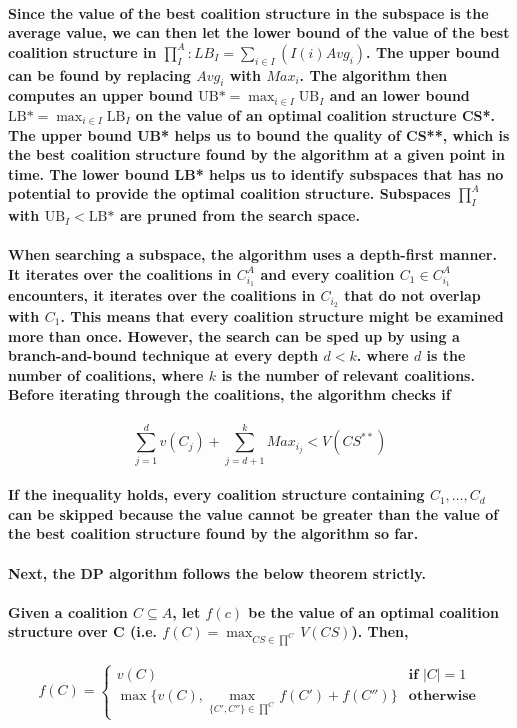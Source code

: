 \documentclass[11pt]{report}
\begin{document}
\paragraph{Since the value of the best coalition structure in the subspace is the average value, we can then let the lower bound of the value of the best coalition structure in $\prod^A_I:LB_I=\sum_{i\in I}(I(i)Avg_i)$. The upper bound can be found by replacing $Avg_i$ with $Max_i$. The algorithm then computes an upper bound $\text{UB*}= \max_{i\in I}\text{UB}_I$ and an lower bound $\text{LB*} = \max_{i\in I}\text{LB}_I$ on the value of an optimal coalition structure CS*. The upper bound UB* helps us to bound the quality of CS**, which is the best coalition structure found by the algorithm at a given point in time. The lower bound LB* helps us to identify subspaces that has no potential to provide the optimal coalition structure. Subspaces $\prod_I^A$ with $\text{UB}_I<\text{LB*}$ are pruned from the search space. }

\paragraph{When searching a subspace, the algorithm uses a depth-first manner. It iterates over the coalitions in $C_{i_1}^A$ and every coalition $C_1 \in C_{i_1}^A$ encounters, it iterates over the coalitions in $C_{i_2}$ that do not overlap with $C_1$. This means that every coalition structure might be examined more than once. However, the search can be sped up by using a branch-and-bound technique at every depth $d < k$. where $d$ is the number of coalitions, where $k$ is the number of relevant coalitions. Before iterating through the coalitions, the algorithm checks if }
\[\sum_{j=1}^dv(C_j)+\sum_{j=d+1}^kMax_{i_j}<V(CS^{**})\]
\paragraph{If the inequality holds, every coalition structure containing $C_1, \dotso, C_d$ can be skipped because the value cannot be greater than the value of the best coalition structure found by the algorithm so far. }

\paragraph{Next, the DP algorithm follows the below theorem strictly.  }
\paragraph{Given a coalition $C \subseteq A $, let $f(c)$ be the value of an optimal coalition structure over C (i.e. $f(C)=\max_{CS\in\prod^C} V(CS)$).  Then, }
\[f(C) = \begin{cases}
	v(C) &\textbf{if }|C|=1 \\
	\max\{v(C), \max_{\{C', C''\}\in\prod^C}f(C')+f(C'')\} & \textbf{otherwise}
\end{cases}\]
\end{document}
